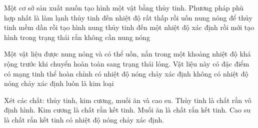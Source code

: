 \begin{ex}
Một cơ sở sản xuất muốn tạo hình một vật bằng thủy tinh. Phương pháp phù hợp nhất là
\choice
{làm lạnh thủy tinh đến nhiệt độ rất thấp rồi uốn}
{\True nung nóng để thủy tinh mềm dần rồi tạo hình}
{nung thủy tinh đến một nhiệt độ xác định rồi mới tạo hình trong trạng thái rắn}
{không cần nung nóng}
\end{ex}

\begin{ex}
Một vật liệu được nung nóng và có thể uốn, nắn trong một khoảng nhiệt độ khá rộng trước khi chuyển hoàn toàn sang trạng thái lỏng. Vật liệu này có đặc điểm
\choice
{có mạng tinh thể hoàn chỉnh}
{có nhiệt độ nóng chảy xác định}
{\True không có nhiệt độ nóng chảy xác định}
{luôn là kim loại}
\end{ex}




\begin{ex}
Xét các chất: thủy tinh, kim cương, muối ăn và cao su.
\choiceTF
{\True Thủy tinh là chất rắn vô định hình.}
{\True Kim cương là chất rắn kết tinh.}
{\True Muối ăn là chất rắn kết tinh.}
{Cao su là chất rắn kết tinh có nhiệt độ nóng chảy xác định.}
\end{ex}

